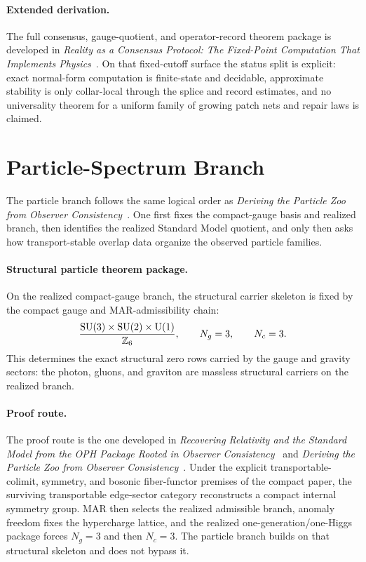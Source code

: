\paragraph{Extended derivation.}
The full consensus, gauge-quotient, and operator-record theorem package is developed in
\emph{Reality as a Consensus Protocol: The Fixed-Point Computation That Implements Physics}~\cite{ophconsensus}.
On that fixed-cutoff surface the status split is explicit: exact normal-form computation is
finite-state and decidable, approximate stability is only collar-local through the splice and
record estimates, and no universality theorem for a uniform family of growing patch nets and
repair laws is claimed.

\section{Particle-Spectrum Branch}

The particle branch follows the same logical order as
\emph{Deriving the Particle Zoo from Observer Consistency}~\cite{ophparticles}.
One first fixes the compact-gauge basis and realized branch, then identifies the realized
Standard Model quotient, and only then asks how transport-stable overlap data organize the
observed particle families.

\paragraph{Structural particle theorem package.}
On the realized compact-gauge branch, the structural carrier skeleton is fixed by the compact
gauge and MAR-admissibility chain:
\[
\frac{\mathrm{SU}(3)\times\mathrm{SU}(2)\times\mathrm{U}(1)}{\mathbb Z_6},
\qquad
N_g=3,
\qquad
N_c=3.
\]
This determines the exact structural zero rows carried by the gauge and gravity sectors:
the photon, gluons, and graviton are massless structural carriers on the realized branch.

\paragraph{Proof route.}
The proof route is the one developed in
\emph{Recovering Relativity and the Standard Model from the OPH Package Rooted in Observer Consistency}~\cite{ophcompact}
and
\emph{Deriving the Particle Zoo from Observer Consistency}~\cite{ophparticles}.
Under the explicit transportable-colimit, symmetry, and bosonic fiber-functor premises of the
compact paper, the surviving transportable edge-sector category reconstructs a compact internal
symmetry group. MAR then selects the realized admissible branch, anomaly freedom
fixes the hypercharge lattice, and the realized one-generation/one-Higgs package forces \(N_g=3\)
and then \(N_c=3\). The particle branch builds on that structural skeleton and does not bypass
it.

